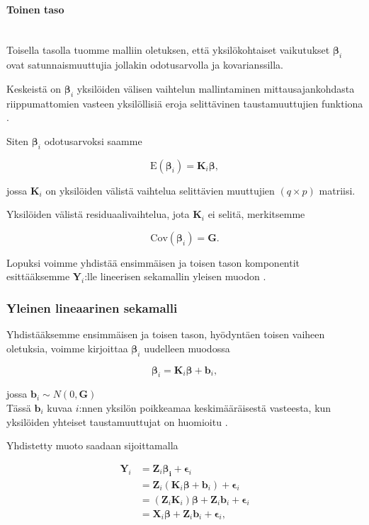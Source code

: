 \documentclass[finnish]{docopts}
\begin{document}
\paragraph{Toinen taso}\mbox{}\\

Toisella tasolla tuomme malliin oletuksen, että yksilökohtaiset vaikutukset $\bm{\beta}_i$ ovat satunnaismuuttujia jollakin odotusarvolla ja kovarianssilla.

Keskeistä on $\bm{\beta}_i$ yksilöiden välisen vaihtelun mallintaminen mittausajankohdasta riippumattomien vasteen yksilöllisiä eroja selittävinen taustamuuttujien funktiona \cite{fitzmaurice11}.

Siten $\bm{\beta}_i$ odotusarvoksi saamme

$$
\text{E}(\bm{\beta}_i) = \bm{K}_i \bm{\beta},
$$

jossa $\bm{K}_i$ on yksilöiden välistä vaihtelua selittävien muuttujien $(q \times p)$ matriisi.

Yksilöiden välistä residuaalivaihtelua, jota $\bm{K}_i$ ei selitä, merkitsemme

$$
\text{Cov}(\bm{\beta}_i) = \bm{G}.
$$

Lopuksi voimme yhdistää ensimmäisen ja toisen tason komponentit esittääksemme $\bm{Y}_i$:lle lineerisen sekamallin yleisen muodon \cite{fitzmaurice11, verbeke00}.

\subsubsection{Yleinen lineaarinen sekamalli}
\label{ssb:ylsm}

Yhdistääksemme ensimmäisen ja toisen tason, hyödyntäen toisen vaiheen oletuksia, voimme kirjoittaa $\bm{\beta}_i$ uudelleen muodossa

$$
\bm{\beta}_i = \bm{K}_i \bm{\beta} + \bm{b}_i,
$$

jossa $\bm{b}_i \sim N(0,\bm{G})$ \\

Tässä $\bm{b}_i$ kuvaa $i$:nnen yksilön poikkeamaa keskimääräisestä vasteesta, kun yksilöiden yhteiset taustamuuttujat on huomioitu \cite{fitzmaurice11}.

Yhdistetty muoto saadaan sijoittamalla

$$
\begin{aligned}
\bm{Y}_i &= \bm{Z}_i \bm{\beta_i} + \bm{\epsilon}_i \\
&= \bm{Z}_i (\bm{K}_i \bm{\beta} + \bm{b}_i) + \bm{\epsilon}_i \\
&= (\bm{Z}_i \bm{K}_i) \bm{\beta} + \bm{Z}_i \bm{b}_i + \bm{\epsilon}_i \\
&= \bm{X}_i \bm{\beta} + \bm{Z}_i \bm{b}_i + \bm{\epsilon}_i, \\
\end{aligned}
$$
\end{document}
